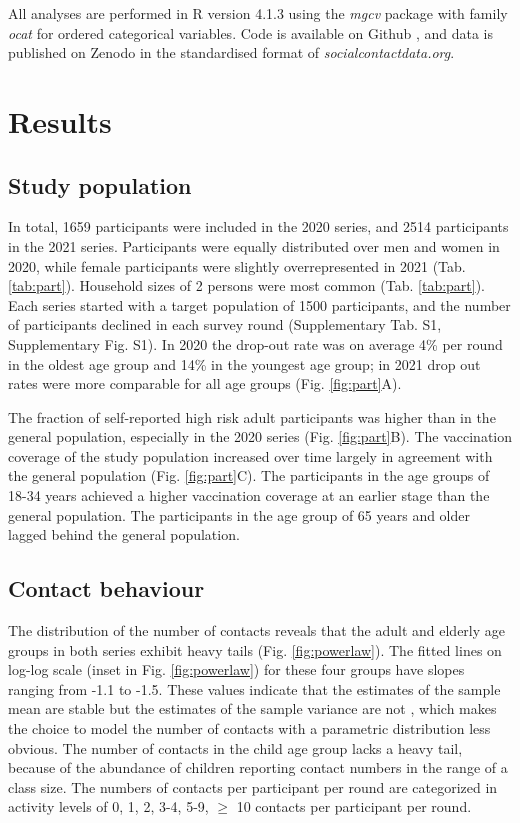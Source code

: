 \documentclass[fleqn,10pt]{wlscirep}
\begin{document}
All analyses are performed in R version 4.1.3 \cite{R_2022} using the \textit{mgcv} package \cite{Wood_2017} with family \textit{ocat} for ordered categorical variables. Code is available on Github \cite{Github_RIVM}, and data is published on Zenodo \cite{Zenodo_2022} in the standardised format of \textit{socialcontactdata.org}.

\section*{Results}

\subsection*{Study population}

In total, 1659 participants were included in the 2020 series, and 2514 participants in the 2021 series. Participants were equally distributed over men and women in 2020, while female participants were slightly overrepresented in 2021 (Tab. \ref{tab:part}). Household sizes of 2 persons were most common (Tab. \ref{tab:part}). Each series started with a target population of 1500 participants, and the number of participants declined in each survey round (Supplementary Tab. S1, Supplementary Fig. S1). In 2020 the drop-out rate was on average 4\% per round in the oldest age group and 14\% in the youngest age group; in 2021 drop out rates were more comparable for all age groups (Fig. \ref{fig:part}A).



The fraction of self-reported high risk adult participants was higher than in the general population, especially in the 2020 series (Fig. \ref{fig:part}B). The vaccination coverage of the study population increased over time largely in agreement with the general population (Fig. \ref{fig:part}C). The participants in the age groups of 18-34 years achieved a higher vaccination coverage at an earlier stage than the general population. The participants in the age group of 65 years and older lagged behind the general population.

\subsection*{Contact behaviour}

The distribution of the number of contacts reveals that the adult and elderly age groups in both series exhibit heavy tails (Fig. \ref{fig:powerlaw}). The fitted lines on log-log scale (inset in Fig. \ref{fig:powerlaw}) for these four groups have slopes ranging from -1.1 to -1.5. These values indicate that the estimates of the sample mean are stable but the estimates of the sample variance are not \cite{Tagore_2015}, which makes the choice to model the number of contacts with a parametric distribution less obvious. The number of contacts in the child age group lacks a heavy tail, because of the abundance of children reporting contact numbers in the range of a class size. The numbers of contacts per participant per round are categorized in activity levels of 0, 1, 2, 3-4, 5-9, $\geq$ 10 contacts per participant per round.
\end{document}
